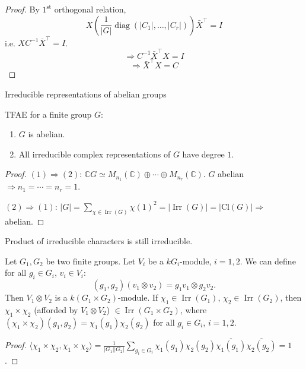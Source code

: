 \documentclass[11pt, a4paper]{report}
\begin{document}
\begin{proof}
By $1^{\text{st}}$ orthogonal relation,
\[
X\left(\frac{1}{|G|} \operatorname{diag}\left(|C_{1}|, \ldots, |C_{r}|\right)\right)\bar{X}^{\top}=I
\]
i.e. $X C^{-1} \bar{X}^{\top}=I$.
\[\Rightarrow C^{-1} \bar{X}^{\top} X=I\]
\[\Rightarrow \bar{X}^{\top} X=C\]
\end{proof}

\begin{theorem}
Irreducible representations of abelian groups

TFAE for a finite group $G$:
\begin{enumerate}
\item $G$ is abelian.
\item All irreducible complex representations of $G$ have degree $1$.
\end{enumerate}
\end{theorem}

\begin{proof}
$(1) \Rightarrow (2)$: $\mathbb{C} G \simeq M_{n_{1}}(\mathbb{C}) \oplus \cdots \oplus M_{n_{r}}(\mathbb{C})$. $G$ abelian $\Rightarrow n_{1}=\cdots=n_{r}=1$.

$(2) \Rightarrow (1)$: $|G|=\sum_{\chi \in \operatorname{Irr}(G)} \chi(1)^{2}=|\operatorname{Irr}(G)|=|\mathrm{Cl}(G)| \Rightarrow$ abelian.
\end{proof}

\begin{lemma}
Product of irreducible characters is still irreducible.
\end{lemma}
Let $G_{1}, G_{2}$ be two finite groups. Let $V_{i}$ be a $k G_{i}$-module, $i=1,2$. We can define for all $g_{i} \in G_{i}$, $v_{i} \in V_{i}$:
\[
(g_{1}, g_{2})(v_{1} \otimes v_{2}) = g_{1}v_{1} \otimes g_{2}v_{2}.
\]
Then $V_{1} \otimes V_{2}$ is a $k(G_{1} \times G_{2})$-module. If $\chi_{1} \in \operatorname{Irr}(G_{1})$, $\chi_{2} \in \operatorname{Irr}(G_{2})$, then $\chi_{1} \times \chi_{2}$ (afforded by $V_{1} \otimes V_{2}$) $\in \operatorname{Irr}(G_{1} \times G_{2})$, where $(\chi_{1} \times \chi_{2})(g_{1}, g_{2}) = \chi_{1}(g_{1})\chi_{2}(g_{2})$ for all $g_{i} \in G_{i}$, $i=1,2$.

\begin{proof}
$\langle \chi_{1} \times \chi_{2}, \chi_{1} \times \chi_{2} \rangle = \frac{1}{|G_{1}||G_{2}|} \sum_{g_{i} \in G_{i}} \chi_{1}(g_{1})\chi_{2}(g_{2})\overline{\chi_{1}(g_{1})}\overline{\chi_{2}(g_{2})} = 1$.
\end{proof}
\end{document}
